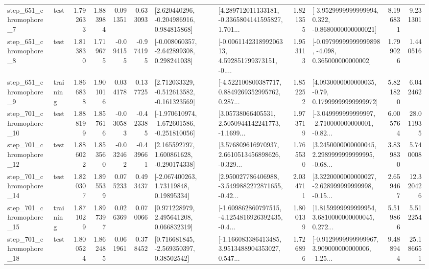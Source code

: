 \begin{tabular}{llrrrrllrlrr}
   step\_651\_chromophore\_7 &      test &      1.792633 &    1.883984 &      0.091351 &  0.633093 &    [2.620440296, -0.204986916, 0.984815868] &  [4.289712011133181, -0.3365804141595827, 1.701... &       1.821355 &  [-3.9529999999999994, 0.322, -0.8680000000000021] &            8.196831 &          9.231301 \\
   step\_651\_chromophore\_8 &      test &      1.813830 &    1.719675 &     -0.094155 & -0.974195 &   [-0.008060357, -2.642899308, 0.298241038] &  [-0.006114231899206313, 4.592851799373151, -0.... &       1.953113 &  [-0.09799999999999898, -4.098, 0.365000000000002] &            1.799026 &          1.440516 \\
   step\_651\_chromophore\_9 &  training &      1.866838 &    1.901016 &      0.034178 &  0.137725 &   [2.712033329, -0.512613582, -0.161323569] &  [-4.522100800387717, 0.8849269352995762, 0.287... &       1.852252 &   [4.0930000000000035, -0.79, 0.17999999999999972] &            5.821820 &          6.042462 \\
  step\_701\_chromophore\_10 &      test &      1.888199 &    1.857616 &     -0.030583 & -0.423385 &  [-1.970610974, -1.672601586, -0.251810056] &  [3.05738066405531, 2.5050944142241773, -1.1699... &       1.973719 &  [-3.049999999999997, -2.710000000000001, -0.82... &            6.005764 &         28.011935 \\
  step\_701\_chromophore\_12 &      test &      1.886022 &    1.853560 &     -0.032462 & -0.439661 &    [2.165592797, 1.600861628, -0.290174338] &  [3.576809616970937, 2.6610513456898626, -0.329... &       1.765530 &  [3.2450000000000045, 2.2989999999999995, -0.68... &            3.839830 &          5.740008 \\
  step\_701\_chromophore\_14 &      test &      1.820307 &    1.895539 &      0.075233 &  0.493437 &      [-2.067400263, 1.73119848, 0.19895334] &  [2.950027786406988, -3.5499882272871655, -0.42... &       2.034711 &  [3.3220000000000027, -2.628999999999998, -0.15... &            2.659467 &         12.320426 \\
  step\_701\_chromophore\_15 &  training &      1.871029 &    1.897397 &      0.026369 &  0.070066 &     [0.971228979, 2.495641208, 0.066832319] &  [-1.609862860797515, -4.1254816926392435, -0.4... &       1.800139 &  [1.8159999999999954, 3.6810000000000045, 0.272... &            5.519866 &          5.512254 \\
  step\_701\_chromophore\_18 &      test &      1.800524 &    1.862485 &      0.061961 &  0.378452 &     [0.716681845, -2.569350397, 0.38502542] &  [-1.166083386413485, 3.9513488904353027, 0.547... &       1.726896 &  [-0.9129999999999967, 3.909000000000006, -1.25... &            9.488944 &         25.186651 \\

\end{tabular}
